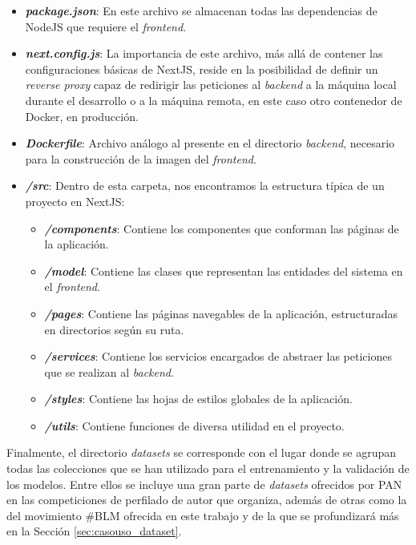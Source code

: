 \begin{itemize}
	\item \textbf{\textit{package.json}}: En este archivo se almacenan todas las dependencias de NodeJS que requiere el \textit{frontend}.
	\item \textbf{\textit{next.config.js}}: La importancia de este archivo, más allá de contener las configuraciones básicas de NextJS, reside en la posibilidad
	      de definir un \textit{reverse proxy} capaz de redirigir las peticiones al \textit{backend} a la máquina local durante el desarrollo o a la máquina remota,
	      en este caso otro contenedor de Docker, en producción.
	\item \textbf{\textit{Dockerfile}}: Archivo análogo al presente en el directorio \textit{backend}, necesario para la construcción de la imagen del \textit{frontend}.
	\item \textbf{\textit{/src}}: Dentro de esta carpeta, nos encontramos la estructura típica de un proyecto en NextJS:
	      \begin{itemize}
		      \item \textbf{\textit{/components}}: Contiene los componentes que conforman las páginas de la aplicación.
		      \item \textbf{\textit{/model}}: Contiene las clases que representan las entidades del sistema en el \textit{frontend}.
		      \item \textbf{\textit{/pages}}: Contiene las páginas navegables de la aplicación, estructuradas en directorios según su ruta.
		      \item \textbf{\textit{/services}}: Contiene los servicios encargados de abstraer las peticiones que se realizan al \textit{backend}.
		      \item \textbf{\textit{/styles}}: Contiene las hojas de estilos globales de la aplicación.
		      \item \textbf{\textit{/utils}}: Contiene funciones de diversa utilidad en el proyecto.
	      \end{itemize}
\end{itemize}

\bigskip
Finalmente, el directorio \textit{datasets} se corresponde con el lugar donde se agrupan todas las colecciones que se han utilizado
para el entrenamiento y la validación de los modelos. Entre ellos se incluye una gran parte de \textit{datasets} ofrecidos por PAN \cite{pan} en las competiciones
de perfilado de autor que organiza, además de otras como la del movimiento \#BLM ofrecida en este trabajo y de la que se profundizará más en la Sección \ref{sec:casouso_dataset}.

